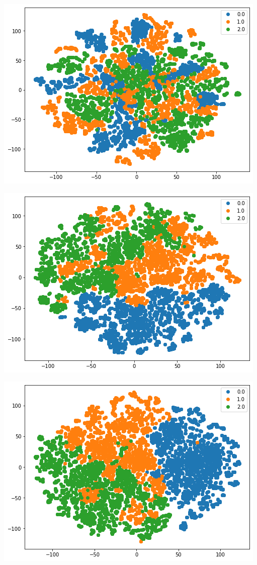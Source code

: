 \documentclass[11pt]{article}
\begin{document}
\begin{center}
\begin{minipage}{0.48\linewidth}
\includegraphics[width=\linewidth]{output_squeezeNet_v1_0epoch.png}
\end{minipage}%
\begin{minipage}{0.49\linewidth}
\includegraphics[width=\linewidth]{output_squeezeNet_v1_10epoch.png}
\end{minipage}
\begin{minipage}{0.49\linewidth}
\includegraphics[width=\linewidth]{output_squeezeNet_v1_30epoch.png}

\end{minipage}
\end{center}
\end{document}
